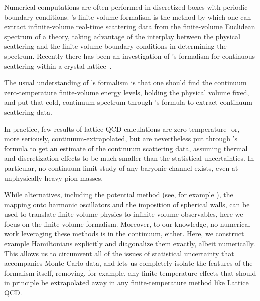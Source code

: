 Numerical computations are often performed in discretized boxes with periodic boundary conditions.
\Luscher's finite-volume formalism\cite{Hamber198399,luscher:1986I,luscher:1986II,wiese1989,Luscher1991,Luscher1991237} is the method by which one can extract infinite-volume real-time scattering data from the finite-volume Euclidean spectrum of a theory, taking advantage of the interplay between the physical scattering and the finite-volume boundary conditions in determining the spectrum.  Recently there has been an investigation of \Luscher's formalism for continuous scattering within a crystal lattice~\cite{Valiente:2015oya}.

The usual understanding of \Luscher's formalism is that one should find the continuum zero-temperature finite-volume energy levels, holding the physical volume fixed, and put that cold, continuum spectrum through \Luscher's formula to extract continuum scattering data. 

In practice, few results of lattice QCD calculations are zero-temperature- or, more seriously, continuum-extrapolated, but are nevertheless put through \Luscher's formula to get an estimate of the continuum scattering data, assuming thermal and discretization effects to be much smaller than the statistical uncertainties.%
In particular, no continuum-limit study of any baryonic channel exists, even at unphysically heavy pion masses.

While alternatives, including the potential method (see, for example ), the mapping onto harmonic oscillators  and the imposition of spherical walls\cite{Borasoy:2007vy,Borasoy:2007vi,Lee:2008fa,Epelbaum:2008vj,Epelbaum:2010xt,Lu:2015riz,Elhatisari:2015iga,Elhatisari:2016owd,Elhatisari:2016hby,Klein:2018lqz,Li:2019ldq,Bovermann:2019jbt,Lahde:2019npb}, can be used to translate finite-volume physics to infinite-volume observables, here we focus on the \Luscher finite-volume formalism.
Moreover, to our knowledge, no numerical work leveraging these methods is in the continuum, either.  
Here, we construct example Hamiltonians explicitly and diagonalize them exactly, albeit numerically.
This allows us to circumvent all of the issues of statistical uncertainty that accompanies Monte Carlo data, and lets us completely isolate the features of the formalism itself, removing, for example, any finite-temperature effects that should in principle be extrapolated away in any finite-temperature method like Lattice QCD.


